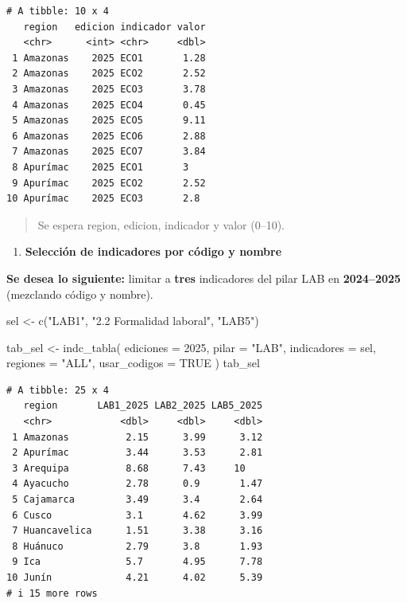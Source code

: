 \documentclass[
  11pt,
  letterpaper,
  DIV=11,
  numbers=noendperiod]{scrartcl}
\newenvironment{Shaded}{\begin{snugshade}}{\end{snugshade}}
\newcommand{\AttributeTok}[1]{\textcolor[rgb]{0.40,0.45,0.13}{#1}}
\newcommand{\ConstantTok}[1]{\textcolor[rgb]{0.56,0.35,0.01}{#1}}
\newcommand{\DecValTok}[1]{\textcolor[rgb]{0.68,0.00,0.00}{#1}}
\newcommand{\FunctionTok}[1]{\textcolor[rgb]{0.28,0.35,0.67}{#1}}
\newcommand{\NormalTok}[1]{\textcolor[rgb]{0.00,0.23,0.31}{#1}}
\newcommand{\OtherTok}[1]{\textcolor[rgb]{0.00,0.23,0.31}{#1}}
\newcommand{\StringTok}[1]{\textcolor[rgb]{0.13,0.47,0.30}{#1}}
\providecommand{\tightlist}{%
  \setlength{\itemsep}{0pt}\setlength{\parskip}{0pt}}\usepackage{longtable,booktabs,array}
\begin{document}
\begin{verbatim}
# A tibble: 10 x 4
   region   edicion indicador valor
   <chr>      <int> <chr>     <dbl>
 1 Amazonas    2025 ECO1       1.28
 2 Amazonas    2025 ECO2       2.52
 3 Amazonas    2025 ECO3       3.78
 4 Amazonas    2025 ECO4       0.45
 5 Amazonas    2025 ECO5       9.11
 6 Amazonas    2025 ECO6       2.88
 7 Amazonas    2025 ECO7       3.84
 8 Apurímac    2025 ECO1       3   
 9 Apurímac    2025 ECO2       2.52
10 Apurímac    2025 ECO3       2.8 
\end{verbatim}

\begin{quote}
Se espera region, edicion, indicador y valor (0--10).
\end{quote}

\begin{enumerate}
\def\labelenumi{\arabic{enumi}.}
\setcounter{enumi}{2}
\tightlist
\item
  \textbf{Selección de indicadores por código y nombre}
\end{enumerate}

\textbf{Se desea lo siguiente:} limitar a \textbf{tres} indicadores del
pilar LAB en \textbf{2024--2025} (mezclando código y nombre).

\begin{Shaded}
\begin{Highlighting}[]
\NormalTok{sel }\OtherTok{\textless{}{-}} \FunctionTok{c}\NormalTok{(}\StringTok{"LAB1"}\NormalTok{, }\StringTok{"2.2 Formalidad laboral"}\NormalTok{, }\StringTok{"LAB5"}\NormalTok{)}

\NormalTok{tab\_sel }\OtherTok{\textless{}{-}} \FunctionTok{indc\_tabla}\NormalTok{(}
  \AttributeTok{ediciones    =} \DecValTok{2025}\NormalTok{,}
  \AttributeTok{pilar        =} \StringTok{"LAB"}\NormalTok{,}
  \AttributeTok{indicadores  =}\NormalTok{ sel,}
  \AttributeTok{regiones     =} \StringTok{"ALL"}\NormalTok{,}
  \AttributeTok{usar\_codigos =} \ConstantTok{TRUE}
\NormalTok{)}
\NormalTok{tab\_sel}
\end{Highlighting}
\end{Shaded}

\begin{verbatim}
# A tibble: 25 x 4
   region       LAB1_2025 LAB2_2025 LAB5_2025
   <chr>            <dbl>     <dbl>     <dbl>
 1 Amazonas          2.15      3.99      3.12
 2 Apurímac          3.44      3.53      2.81
 3 Arequipa          8.68      7.43     10   
 4 Ayacucho          2.78      0.9       1.47
 5 Cajamarca         3.49      3.4       2.64
 6 Cusco             3.1       4.62      3.99
 7 Huancavelica      1.51      3.38      3.16
 8 Huánuco           2.79      3.8       1.93
 9 Ica               5.7       4.95      7.78
10 Junín             4.21      4.02      5.39
# i 15 more rows
\end{verbatim}
\end{document}
